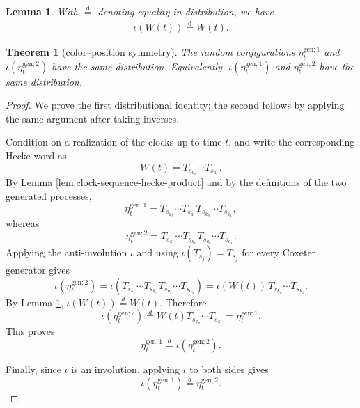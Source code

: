 \documentclass[10pt,a4paper]{amsart}
\newtheorem{lemma}{Lemma}
\newtheorem{theorem}{Theorem}
\begin{document}
\begin{lemma}
\label{lem:d-equality}
With $\overset{\text{d}}{=}$ denoting equality in distribution, we have 
\begin{align}
\iota(W(t)) \overset{\text{d}}{=} W(t).
\end{align}
\end{lemma}

\begin{theorem}[color--position symmetry]
\label{thm:color-position}
The random configurations $\eta_t^{\mathrm{gen};1}$ and $\iota(\eta_t^{\mathrm{gen};2})$ have the same distribution. Equivalently, $\iota(\eta_t^{\mathrm{gen};1})$ and $\eta_t^{\mathrm{gen};2}$ have the same distribution.
\end{theorem}

\begin{proof}
We prove the first distributional identity; the second follows by applying the same argument after taking inverses.

Condition on a realization of the clocks up to time $t$, and write the corresponding Hecke word as
\[
W(t)=T_{s_{a_r}}\cdots T_{s_{a_1}}.
\]
By Lemma \ref{lem:clock-sequence-hecke-product} and by the definitions of the two generated processes,
\[
\eta_t^{\mathrm{gen};1}
=
T_{s_{a_r}}\cdots T_{s_{a_1}}
T_{s_{k_n}}\cdots T_{s_{k_1}},
\]
whereas
\[
\eta_t^{\mathrm{gen};2}
=
T_{s_{k_1}}\cdots T_{s_{k_n}}
T_{s_{a_r}}\cdots T_{s_{a_1}}.
\]
Applying the anti-involution $\iota$ and using $\iota(T_{s_j})=T_{s_j}$ for every Coxeter generator gives
\[
\iota(\eta_t^{\mathrm{gen};2})
=
\iota\!\left(
T_{s_{k_1}}\cdots T_{s_{k_n}}
T_{s_{a_r}}\cdots T_{s_{a_1}}
\right)
=
\iota(W(t))\,T_{s_{k_n}}\cdots T_{s_{k_1}}.
\]
By Lemma \ref{lem:d-equality}, $\iota(W(t))\overset{d}{=}W(t)$. 
Therefore
\[
\iota(\eta_t^{\mathrm{gen};2})
\overset{d}{=}
W(t)T_{s_{k_n}}\cdots T_{s_{k_1}}
=
\eta_t^{\mathrm{gen};1}.
\]
This proves
\[
\eta_t^{\mathrm{gen};1}\overset{d}{=}\iota(\eta_t^{\mathrm{gen};2}).
\]

Finally, since $\iota$ is an involution, applying $\iota$ to both sides gives
\[
\iota(\eta_t^{\mathrm{gen};1})
\overset{d}{=}
\eta_t^{\mathrm{gen};2}.
\]
\end{proof}
\end{document}

